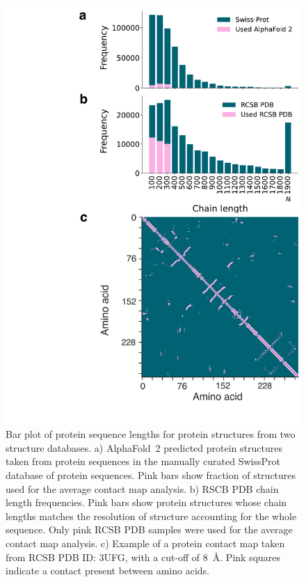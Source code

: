 \documentclass[
reprint,
twocolumn,
amsmath,amssymb,superscriptaddress,aps,
pre]{revtex4-1}
\begin{document}
 \begin{figure}[htb]
        \centering
	\includegraphics[width=0.9\columnwidth]{paper/figures/Fig2/Fig2.pdf}
	    \caption{Bar plot of protein sequence lengths for protein structures from two structure databases. a) AlphaFold~2 predicted protein structures taken from protein sequences in the manually curated SwissProt database of protein sequences. Pink bars show fraction of structures used for the average contact map analysis. b) RSCB PDB chain length frequencies. Pink bars show protein structures whose chain lengths matches the resolution of structure accounting for the whole sequence. Only pink RCSB PDB samples were used for the average contact map analysis. c) Example of a protein contact map taken from RCSB PDB ID: 3UFG, with a cut-off of 8~Å. Pink squares indicate a contact present between amino acids.}
        \label{fig:pdb_stats}
\end{figure}
\end{document}
